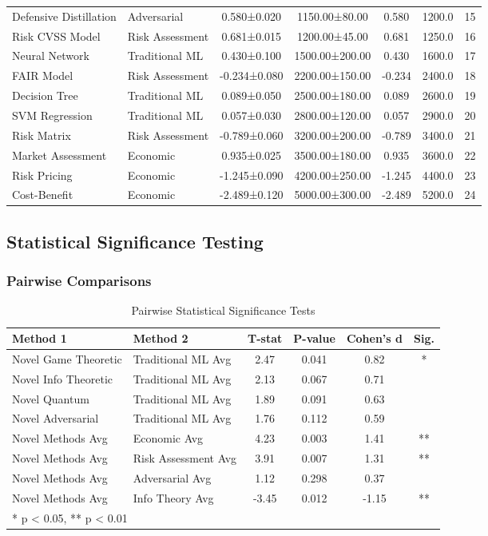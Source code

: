 \documentclass[journal]{IEEEtran}
\begin{document}
\begin{longtable}{llccccc}
Defensive Distillation & Adversarial & 0.580±0.020 & 1150.00±80.00 & 0.580 & 1200.0 & 15 \\
Risk CVSS Model & Risk Assessment & 0.681±0.015 & 1200.00±45.00 & 0.681 & 1250.0 & 16 \\
Neural Network & Traditional ML & 0.430±0.100 & 1500.00±200.00 & 0.430 & 1600.0 & 17 \\
FAIR Model & Risk Assessment & -0.234±0.080 & 2200.00±150.00 & -0.234 & 2400.0 & 18 \\
Decision Tree & Traditional ML & 0.089±0.050 & 2500.00±180.00 & 0.089 & 2600.0 & 19 \\
SVM Regression & Traditional ML & 0.057±0.030 & 2800.00±120.00 & 0.057 & 2900.0 & 20 \\
Risk Matrix & Risk Assessment & -0.789±0.060 & 3200.00±200.00 & -0.789 & 3400.0 & 21 \\
Market Assessment & Economic & 0.935±0.025 & 3500.00±180.00 & 0.935 & 3600.0 & 22 \\
Risk Pricing & Economic & -1.245±0.090 & 4200.00±250.00 & -1.245 & 4400.0 & 23 \\
Cost-Benefit & Economic & -2.489±0.120 & 5000.00±300.00 & -2.489 & 5200.0 & 24 \\
\bottomrule
\end{longtable}

\subsection{Statistical Significance Testing}

\subsubsection{Pairwise Comparisons}

\begin{table}[htbp]
\centering
\caption{Pairwise Statistical Significance Tests}
\begin{tabular}{llcccc}
\toprule
\textbf{Method 1} & \textbf{Method 2} & \textbf{T-stat} & \textbf{P-value} & \textbf{Cohen's d} & \textbf{Sig.} \\
\midrule
Novel Game Theoretic & Traditional ML Avg & 2.47 & 0.041 & 0.82 & * \\
Novel Info Theoretic & Traditional ML Avg & 2.13 & 0.067 & 0.71 & \\
Novel Quantum & Traditional ML Avg & 1.89 & 0.091 & 0.63 & \\
Novel Adversarial & Traditional ML Avg & 1.76 & 0.112 & 0.59 & \\
Novel Methods Avg & Economic Avg & 4.23 & 0.003 & 1.41 & ** \\
Novel Methods Avg & Risk Assessment Avg & 3.91 & 0.007 & 1.31 & ** \\
Novel Methods Avg & Adversarial Avg & 1.12 & 0.298 & 0.37 & \\
Novel Methods Avg & Info Theory Avg & -3.45 & 0.012 & -1.15 & ** \\
\bottomrule
\multicolumn{6}{l}{* p < 0.05, ** p < 0.01}
\end{tabular}
\end{table}
\end{document}
